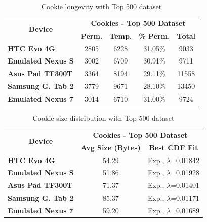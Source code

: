 \documentclass{acm_proc_article-sp}
\begin{document}
\begin{table}[htbp]
  \centering
  \caption{Cookie longevity with Top 500 dataset}
    \begin{tabular}{|c|c|c|c|c|}
    \hline
    \multicolumn{1}{|c|}{\multirow{2}[4]{*}{\textbf{Device}}} & \multicolumn{4}{|c|}{\textbf{Cookies - Top 500 Dataset}} \\ \cline{2-5}
    \multicolumn{1}{|c|}{} & \textbf{Perm.} & \textbf{Temp.} & \textbf{\% Perm.} & \textbf{Total} \\ \hline
    \multicolumn{1}{|l|}{\textbf{HTC Evo 4G}} & 2805  & 6228  & 31.05\% & 9033 \\
    \multicolumn{1}{|l|}{\textbf{Emulated Nexus S}} & 3002  & 6709  & 30.91\% & 9711 \\
    \multicolumn{1}{|l|}{\textbf{Asus Pad TF300T}} & 3364  & 8194  & 29.11\% & 11558 \\
    \multicolumn{1}{|l|}{\textbf{Samsung G. Tab 2}} & 3779  & 9671  & 28.10\% & 13450 \\
    \multicolumn{1}{|l|}{\textbf{Emulated Nexus 7}} & 3014  & 6710  & 31.00\% & 9724 \\ \hline
    \end{tabular}%
  \label{tab:addlabel}%
\end{table}%

\begin{table}[htbp]
  \centering
  \caption{Cookie size distribution with Top 500 dataset}
    \begin{tabular}{|c|c|c|}
    \hline
    \multicolumn{1}{|c|}{\multirow{2}[4]{*}{\textbf{Device}}} & \multicolumn{2}{|c|}{\textbf{Cookies - Top 500 Dataset}} \\ \cline{2-3}
    \multicolumn{1}{|c|}{} & \textbf{Avg Size (Bytes)} & \textbf{Best CDF Fit} \\ \hline
    \multicolumn{1}{|l|}{\textbf{HTC Evo 4G}} & 54.29 & Exp., $\lambda$=0.01842 \\
    \multicolumn{1}{|l|}{\textbf{Emulated Nexus S}} & 51.86 & Exp., $\lambda$=0.01928 \\
    \multicolumn{1}{|l|}{\textbf{Asus Pad TF300T}} & 71.37 & Exp., $\lambda$=0.01401 \\
    \multicolumn{1}{|l|}{\textbf{Samsung G. Tab 2}} & 85.37 & Exp., $\lambda$=0.01171 \\
    \multicolumn{1}{|l|}{\textbf{Emulated Nexus 7}} & 59.20 & Exp., $\lambda$=0.01689 \\ \hline
    \end{tabular}%
  \label{tab:addlabel}%
\end{table}%
\end{document}
